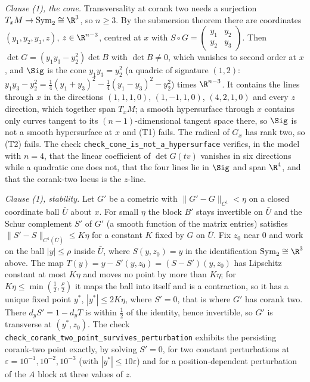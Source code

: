 \emph{Clause (1), the cone.} Transversality at corank two needs a surjection $T_xM \to \mathrm{Sym}_2 \cong \R^3$, so $n \geq 3$. By the submersion theorem there are coordinates $(y_1, y_2, y_3, z)$, $z \in \R^{n-3}$, centred at $x$ with $S \circ G = \begin{pmatrix} y_1 & y_2 \\ y_2 & y_3\end{pmatrix}$. Then $\det G = (y_1 y_3 - y_2^2)\det B$ with $\det B \neq 0$, which vanishes to second order at $x$, and $\Sig$ is the cone $y_1 y_3 = y_2^2$ (a quadric of signature $(1,2)$: $y_1 y_3 - y_2^2 = \tfrac14(y_1 + y_3)^2 - \tfrac14(y_1 - y_3)^2 - y_2^2$) times $\R^{n-3}$. It contains the lines through $x$ in the directions $(1,1,1,0)$, $(1,-1,1,0)$, $(4,2,1,0)$ and every $z$ direction, which together span $T_xM$; a smooth hypersurface through $x$ contains only curves tangent to its $(n-1)$-dimensional tangent space there, so $\Sig$ is not a smooth hypersurface at $x$ and (T1) fails. The radical of $G_x$ has rank two, so (T2) fails. The check \texttt{check\_cone\_is\_not\_a\_hypersurface} verifies, in the model with $n = 4$, that the linear coefficient of $\det G(tv)$ vanishes in six directions while a quadratic one does not, that the four lines lie in $\Sig$ and span $\R^4$, and that the corank-two locus is the $z$-line.

\emph{Clause (1), stability.} Let $G'$ be a cometric with $\|G' - G\|_{C^1} < \eta$ on a closed coordinate ball $\bar U$ about $x$. For small $\eta$ the block $B'$ stays invertible on $\bar U$ and the Schur complement $S'$ of $G'$ (a smooth function of the matrix entries) satisfies $\|S' - S\|_{C^1(\bar U)} \leq K\eta$ for a constant $K$ fixed by $G$ on $\bar U$. Fix $z_0$ near $0$ and work on the ball $|y| \leq \rho$ inside $\bar U$, where $S(y, z_0) = y$ in the identification $\mathrm{Sym}_2 \cong \R^3$ above. The map $T(y) = y - S'(y, z_0) = (S - S')(y, z_0)$ has Lipschitz constant at most $K\eta$ and moves no point by more than $K\eta$; for $K\eta \leq \min(\tfrac12, \tfrac{\rho}{2})$ it maps the ball into itself and is a contraction, so it has a unique fixed point $y^{*}$, $|y^{*}| \leq 2K\eta$, where $S' = 0$, that is where $G'$ has corank two. There $d_y S' = 1 - d_yT$ is within $\tfrac12$ of the identity, hence invertible, so $G'$ is transverse at $(y^{*}, z_0)$. The check \texttt{check\_corank\_two\_point\_survives\_perturbation} exhibits the persisting corank-two point exactly, by solving $S' = 0$, for two constant perturbations at $\varepsilon = 10^{-1}, 10^{-2}, 10^{-3}$ (with $|y^{*}| \leq 10\varepsilon$) and for a position-dependent perturbation of the $A$ block at three values of $z$.

